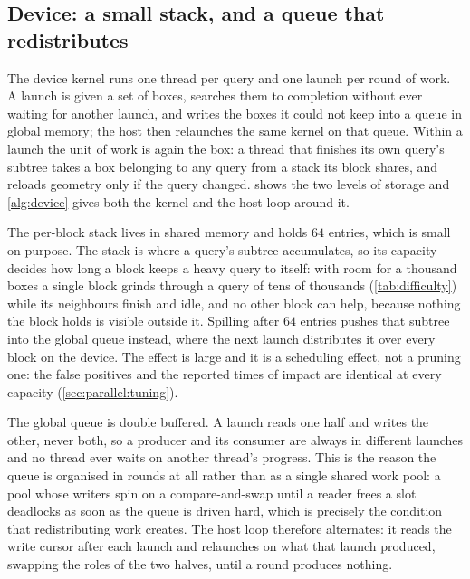 \subsection{Device: a small stack, and a queue that redistributes}
\label{sec:parallel:device}

The device kernel runs one thread per query and one launch per round of work. A
launch is given a set of boxes, searches them to completion without ever waiting
for another launch, and writes the boxes it could not keep into a queue in global
memory; the host then relaunches the same kernel on that queue. Within a launch
the unit of work is again the box: a thread that finishes its own query's subtree
takes a box belonging to any query from a stack its block shares, and reloads
geometry only if the query changed.  shows the two levels
of storage and \cref{alg:device} gives both the kernel and the host loop around
it.

The per-block stack lives in shared memory and holds $64$ entries, which is
small on purpose. The stack is where a query's subtree accumulates, so its
capacity decides how long a block keeps a heavy query to itself: with room for a
thousand boxes a single block grinds through a query of tens of thousands
(\cref{tab:difficulty}) while its neighbours finish and idle, and no other block
can help, because nothing the block holds is visible outside it. Spilling after $64$ entries pushes that
subtree into the global queue instead, where the next launch distributes it over
every block on the device. The effect is large and it is a scheduling effect, not
a pruning one: the false positives and the reported times of impact are identical
at every capacity (\cref{sec:parallel:tuning}).

The global queue is double buffered. A launch reads one half and writes the
other, never both, so a producer and its consumer are always in different
launches and no thread ever waits on another thread's progress. This is the
reason the queue is organised in rounds at all rather than as a single shared
work pool: a pool whose writers spin on a compare-and-swap until a reader frees a
slot deadlocks as soon as the queue is driven hard, which is precisely the
condition that redistributing work creates. The host loop therefore alternates:
it reads the write cursor after each launch and relaunches on what that launch
produced, swapping the roles of the two halves, until a round produces nothing.

